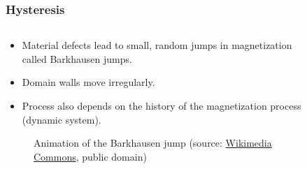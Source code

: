 \begin{frame}
	\frametitle{Hysteresis}
	\begin{columns}
		\begin{column}{0.575\textwidth}
            \begin{itemize}
                \item Material defects lead to small, random jumps in magnetization called Barkhausen jumps.
                \item Domain walls move irregularly.
                \item Process also depends on the history of the magnetization process (dynamic system).
            \end{itemize}
			\begin{figure}
                \centering
                \caption{Animation of the Barkhausen jump (source: \href{https://commons.wikimedia.org/wiki/File:Barkhausensprung.gif}{Wikimedia Commons},  public domain)}
            \end{figure}
		\end{column}
        \hfill
		\begin{column}{0.425\textwidth}
            \vspace{-0.2cm}
			\begin{figure}
				\centering

\end{figure}
\end{column}
\end{columns}
\end{frame}
